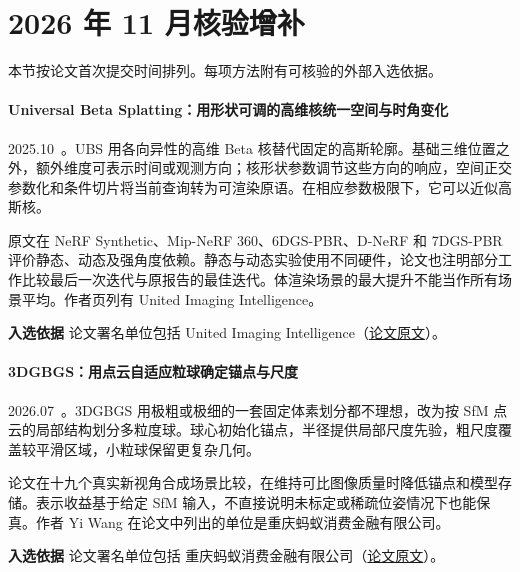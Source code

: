 \section{2026 年 11 月核验增补}

本节按论文首次提交时间排列。每项方法附有可核验的外部入选依据。

\paragraph{Universal Beta Splatting：用形状可调的高维核统一空间与时角变化}
2025.10~\cite{2510_03312}。UBS 用各向异性的高维 Beta 核替代固定的高斯轮廓。基础三维位置之外，额外维度可表示时间或观测方向；核形状参数调节这些方向的响应，空间正交参数化和条件切片将当前查询转为可渲染原语。在相应参数极限下，它可以近似高斯核。

原文在 NeRF Synthetic、Mip-NeRF 360、6DGS-PBR、D-NeRF 和 7DGS-PBR 评价静态、动态及强角度依赖。静态与动态实验使用不同硬件，论文也注明部分工作比较最后一次迭代与原报告的最佳迭代。体渲染场景的最大提升不能当作所有场景平均。作者页列有 United Imaging Intelligence。

\textbf{入选依据} 论文署名单位包括 United Imaging Intelligence（\href{https://arxiv.org/html/2510.03312v3}{论文原文}）。

\paragraph{3DGBGS：用点云自适应粒球确定锚点与尺度}
2026.07~\cite{2607_26578}。3DGBGS 用极粗或极细的一套固定体素划分都不理想，改为按 SfM 点云的局部结构划分多粒度球。球心初始化锚点，半径提供局部尺度先验，粗尺度覆盖较平滑区域，小粒球保留更复杂几何。

论文在十九个真实新视角合成场景比较，在维持可比图像质量时降低锚点和模型存储。表示收益基于给定 SfM 输入，不直接说明未标定或稀疏位姿情况下也能保真。作者 Yi Wang 在论文中列出的单位是重庆蚂蚁消费金融有限公司。

\textbf{入选依据} 论文署名单位包括 重庆蚂蚁消费金融有限公司（\href{https://arxiv.org/html/2607.26578v1}{论文原文}）。
